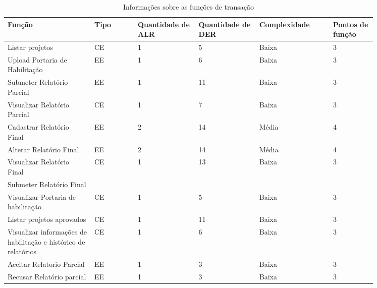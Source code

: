 \begin{table*}[!h]
\centering
\caption{Informações sobre as funções de transação}
\label{Rotulo}
  \begin{tabular}{p{0.20\linewidth}p{0.10\linewidth}p{0.14\linewidth}p{0.14\linewidth}p{0.17\linewidth}p{0.10\linewidth}}
\hline
\textbf{Função} & \textbf{Tipo} & \textbf{Quantidade de ALR} & \textbf{Quantidade de DER} & \textbf{Complexidade} & \textbf{Pontos de função} \\
\hline
Listar projetos & CE & 1 & 5 & Baixa & 3 \\
\hline
Upload Portaria de Habilitação & EE & 1 & 6 & Baixa & 3 \\
\hline
Submeter Relatório Parcial & EE & 1 & 11 & Baixa & 3 \\
\hline
Visualizar Relatório Parcial & CE & 1 & 7 & Baixa & 3 \\
\hline
Cadastrar Relatório Final & EE & 2 & 14 & Média & 4 \\
\hline
Alterar Relatório Final & EE & 2 & 14 & Média & 4 \\
\hline
Visualizar Relatório Final & CE & 1 & 13 & Baixa & 3 \\
\hline
Submeter Relatório Final &  &  &  &  &  \\
\hline
Visualizar Portaria de habilitação & CE & 1 & 5 & Baixa & 3 \\
\hline
Listar projetos aprovados & CE & 1 & 11 & Baixa & 3 \\
\hline
Visualizar informações de habilitação e histórico de relatórios & CE & 1 & 6 & Baixa & 3 \\
\hline
Aceitar Relatorio Parcial & EE & 1 & 3 & Baixa & 3 \\
\hline
Recusar Relatório parcial & EE & 1 & 3 & Baixa & 3\\
\end{tabular}
\end{table*}

